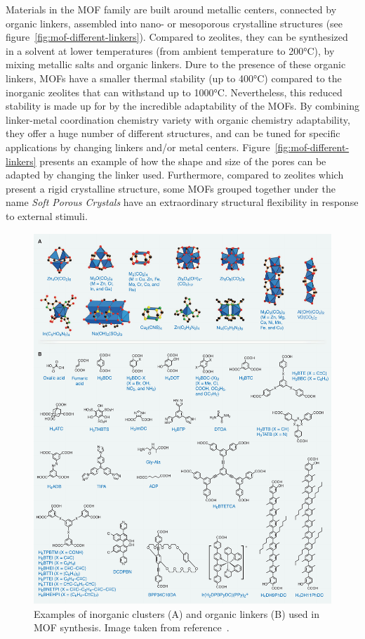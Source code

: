 \documentclass[thesis]{subfiles}
\begin{document}
Materials in the MOF family are built around metallic centers, connected by
organic linkers, assembled into nano- or mesoporous crystalline structures (see
figure~\ref{fig:mof-different-linkers}). Compared to zeolites, they can be
synthesized in a solvent at lower temperatures (from ambient temperature to
200°C), by mixing metallic salts and organic linkers. Dure to the presence of
these organic linkers, MOFs have a smaller thermal stability (up to 400°C)
compared to the inorganic zeolites that can withstand up to 1000°C.
Nevertheless, this reduced stability is made up for by the incredible
adaptability of the MOFs. By combining linker-metal coordination chemistry
variety with organic chemistry adaptability, they offer a huge number of
different structures, and can be tuned for specific applications by changing
linkers and/or metal centers. Figure~\ref{fig:mof-different-linkers} presents an
example of how the shape and size of the pores can be adapted by changing the
linker used. Furthermore, compared to zeolites which present a rigid crystalline
structure, some MOFs grouped together under the name \emph{Soft Porous
Crystals}\cite{Horike2009} have an extraordinary structural flexibility in
response to external stimuli\cite{Kitagawa2005, Bradshaw2005, Coudert2015}.

\begin{figure}[p]
    \centering
    \includegraphics[width=\textwidth]{figures/cited/mof-building-blocks}
    \caption{Examples of inorganic clusters (A) and organic linkers (B) used in
    MOF synthesis. Image taken from reference~\cite{Furukawa2013}.}
    \label{fig:mof-building-blocks}
\end{figure}
\end{document}
